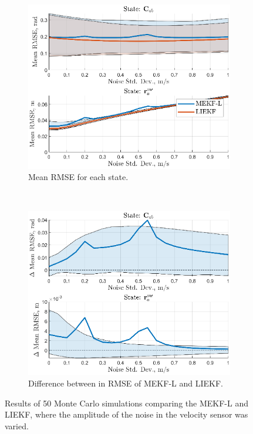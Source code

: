 \begin{figure}
	\centering
	\begin{subfigure}[b]{0.5\textwidth}
		\includegraphics[width=\textwidth]{figs/se3/noise_trials/comp_noise_rmse_state_Vel_L.eps}
		\caption{Mean RMSE for each state.}
	\end{subfigure}
	~
	\begin{subfigure}[b]{0.5\textwidth}
		\includegraphics[width=\textwidth]{figs/se3/noise_trials/comp_noise_diff_state_Vel_L.eps}
		\caption{Difference between in RMSE of MEKF-L and LIEKF.}
	\end{subfigure}
	\caption[Results comparing the MEKF-L and LIEKF varying velocity sensor noise.]{Results of 50 Monte Carlo simulations comparing the MEKF-L and LIEKF, where the amplitude of the noise in the velocity sensor was varied. }
	\label{fig:comp_noise_vel_L}
\end{figure}



